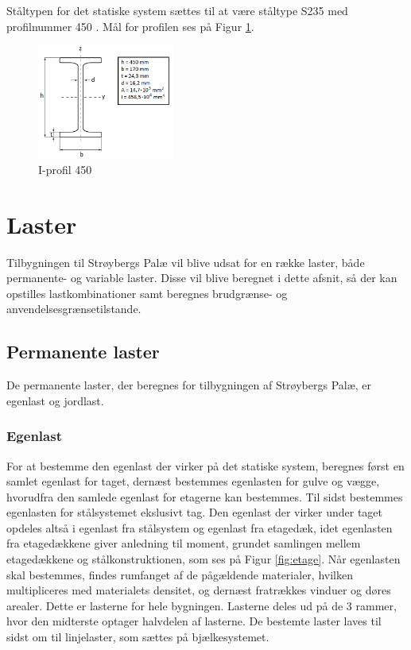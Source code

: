 Ståltypen for det statiske system sættes til at være ståltype S235 med profilnummer 450 \citep{stabi}. Mål for profilen ses på Figur \ref{fig:iprofil}. 

\begin{figure}[H]
	\centering
	\includegraphics[width=0.4\textwidth]{billeder/iprofil.png}
	\caption{I-profil 450}
	\label{fig:iprofil}
\end{figure}

\section{Laster}
Tilbygningen til Strøybergs Palæ vil blive udsat for en række laster, både permanente- og variable laster. Disse vil blive beregnet i dette afsnit, så der kan opstilles lastkombinationer samt beregnes brudgrænse- og anvendelsesgrænsetilstande.

\subsection{Permanente laster}
De permanente laster, der beregnes for tilbygningen af Strøybergs Palæ, er egenlast og jordlast.

\subsubsection{Egenlast}
For at bestemme den egenlast der virker på det statiske system, beregnes først en samlet egenlast for taget, dernæst bestemmes egenlasten for gulve og vægge, hvorudfra den samlede egenlast for etagerne kan bestemmes. Til sidst bestemmes egenlasten for stålsystemet ekslusivt tag. Den egenlast der virker under taget opdeles altså i egenlast fra stålsystem og egenlast fra etagedæk, idet egenlasten fra etagedækkene giver anledning til moment, grundet samlingen mellem etagedækkene og stålkonstruktionen, som ses på Figur \ref{fig:etage}. 
\newline \indent{     }  Når egenlasten skal bestemmes, findes rumfanget af de pågældende materialer, hvilken multipliceres med materialets densitet, og dernæst fratrækkes vinduer og døres arealer. Dette er lasterne for hele bygningen. Lasterne deles ud på de 3 rammer, hvor den midterste optager halvdelen af lasterne. De bestemte laster laves til sidst om til linjelaster, som sættes på bjælkesystemet.  

